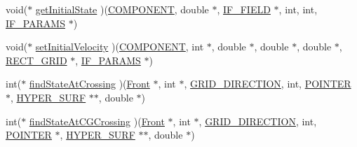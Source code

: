 \begin{DoxyCompactItemize}
\item 
void($\ast$ \hyperlink{class_incompress___solver___smooth___basis_a99f48d4fd354fa555ec1d191a7fb568f}{get\+Initial\+State} )(\hyperlink{int_8h_a2bb7be12ca59ea6443c8757df0a7c278}{C\+O\+M\+P\+O\+N\+E\+NT}, double $\ast$, \hyperlink{i_fluid_8h_a2b9d43f92a76a1ecbc4a940ad9edb5d8}{I\+F\+\_\+\+F\+I\+E\+LD} $\ast$, int, int, \hyperlink{i_fluid_8h_d8/d1e/struct_i_f___p_a_r_a_m_s}{I\+F\+\_\+\+P\+A\+R\+A\+MS} $\ast$)
\item 
void($\ast$ \hyperlink{class_incompress___solver___smooth___basis_ae687f7aa455c0a550b63bdb5b2386d2f}{set\+Initial\+Velocity} )(\hyperlink{int_8h_a2bb7be12ca59ea6443c8757df0a7c278}{C\+O\+M\+P\+O\+N\+E\+NT}, int $\ast$, double $\ast$, double $\ast$, double $\ast$, \hyperlink{geom_8h_a983fdb6b46c9b99969bffa62eae7d31d}{R\+E\+C\+T\+\_\+\+G\+R\+ID} $\ast$, \hyperlink{i_fluid_8h_d8/d1e/struct_i_f___p_a_r_a_m_s}{I\+F\+\_\+\+P\+A\+R\+A\+MS} $\ast$)
\item 
int($\ast$ \hyperlink{class_incompress___solver___smooth___basis_a30cd8cfd805153f9576469ac4f78aebe}{find\+State\+At\+Crossing} )(\hyperlink{fdecs_8h_ac32202b798f848095c489cfd04c4ca5f}{Front} $\ast$, int $\ast$, \hyperlink{int_8h_aa7cc507beba6455174c0996f89fdc8c3}{G\+R\+I\+D\+\_\+\+D\+I\+R\+E\+C\+T\+I\+ON}, int, \hyperlink{cdecs_8h_ae51a81000f343b8ec43bca1f6a723d7b}{P\+O\+I\+N\+T\+ER} $\ast$, \hyperlink{int_8h_acef50fa4757ce0d3f75c97fab5a175bc}{H\+Y\+P\+E\+R\+\_\+\+S\+U\+RF} $\ast$$\ast$, double $\ast$)
\item 
int($\ast$ \hyperlink{class_incompress___solver___smooth___basis_a3a9f5110ae80be1bca8d0d1903faed10}{find\+State\+At\+C\+G\+Crossing} )(\hyperlink{fdecs_8h_ac32202b798f848095c489cfd04c4ca5f}{Front} $\ast$, int $\ast$, \hyperlink{int_8h_aa7cc507beba6455174c0996f89fdc8c3}{G\+R\+I\+D\+\_\+\+D\+I\+R\+E\+C\+T\+I\+ON}, int, \hyperlink{cdecs_8h_ae51a81000f343b8ec43bca1f6a723d7b}{P\+O\+I\+N\+T\+ER} $\ast$, \hyperlink{int_8h_acef50fa4757ce0d3f75c97fab5a175bc}{H\+Y\+P\+E\+R\+\_\+\+S\+U\+RF} $\ast$$\ast$, double $\ast$)
\end{DoxyCompactItemize}
